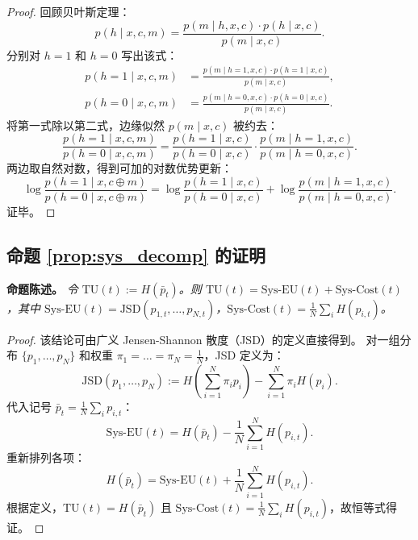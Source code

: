 \documentclass{article}
\theoremstyle{plain}
\theoremstyle{definition}
\theoremstyle{remark}
\begin{document}
\begin{proof}
回顾贝叶斯定理：
\begin{equation}
    p(h \mid x, c, m) = \frac{p(m \mid h, x, c) \cdot p(h \mid x, c)}{p(m \mid x, c)}.
\end{equation}
分别对 $h=1$ 和 $h=0$ 写出该式：
\begin{align}
    p(h=1 \mid x, c, m) &= \frac{p(m \mid h=1, x, c) \cdot p(h=1 \mid x, c)}{p(m \mid x, c)}, \\
    p(h=0 \mid x, c, m) &= \frac{p(m \mid h=0, x, c) \cdot p(h=0 \mid x, c)}{p(m \mid x, c)}.
\end{align}
将第一式除以第二式，边缘似然 $p(m \mid x, c)$ 被约去：
\begin{equation}
    \frac{p(h=1 \mid x, c, m)}{p(h=0 \mid x, c, m)} = \frac{p(h=1 \mid x, c)}{p(h=0 \mid x, c)} \cdot \frac{p(m \mid h=1, x, c)}{p(m \mid h=0, x, c)}.
\end{equation}
两边取自然对数，得到可加的对数优势更新：
\begin{equation}
    \log \frac{p(h=1 \mid x, c \oplus m)}{p(h=0 \mid x, c \oplus m)}
    =
    \log \frac{p(h=1 \mid x, c)}{p(h=0 \mid x, c)}
    +
    \log \frac{p(m \mid h=1, x, c)}{p(m \mid h=0, x, c)}.
\end{equation}
证毕。
\end{proof}

\subsection{命题 \ref{prop:sys_decomp} 的证明}\label{app:proof_prop2}
\textbf{命题陈述。}
\textit{
令 $\mathrm{TU}(t) := H(\bar{p}_t)$。则 $\mathrm{TU}(t) = \mathrm{Sys\mbox{-}EU}(t) + \mathrm{Sys\mbox{-}Cost}(t)$，其中 $\mathrm{Sys\mbox{-}EU}(t) = \mathrm{JSD}(p_{1,t}, \dots, p_{N,t})$，$\mathrm{Sys\mbox{-}Cost}(t) = \frac{1}{N}\sum_i H(p_{i,t})$。
}

\begin{proof}
该结论可由广义 Jensen-Shannon 散度（JSD）的定义直接得到。
对一组分布 $\{p_1, \dots, p_N\}$ 和权重 $\pi_1 = \dots = \pi_N = \frac{1}{N}$，JSD 定义为：
\begin{equation}
    \mathrm{JSD}(p_1, \dots, p_N) := H\left(\sum_{i=1}^N \pi_i p_i\right) - \sum_{i=1}^N \pi_i H(p_i).
\end{equation}
代入记号 $\bar{p}_t = \frac{1}{N}\sum_i p_{i,t}$：
\begin{equation}
    \mathrm{Sys\mbox{-}EU}(t) = H(\bar{p}_t) - \frac{1}{N}\sum_{i=1}^N H(p_{i,t}).
\end{equation}
重新排列各项：
\begin{equation}
    H(\bar{p}_t) = \mathrm{Sys\mbox{-}EU}(t) + \frac{1}{N}\sum_{i=1}^N H(p_{i,t}).
\end{equation}
根据定义，$\mathrm{TU}(t) = H(\bar{p}_t)$ 且 $\mathrm{Sys\mbox{-}Cost}(t) = \frac{1}{N}\sum_i H(p_{i,t})$，故恒等式得证。
\end{proof}
\end{document}
